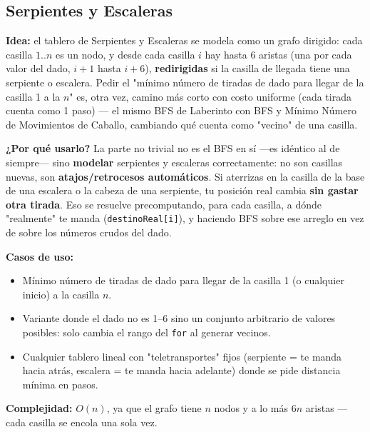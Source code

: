 \documentclass[10pt,a4paper,twocolumn]{article}
\begin{document}
\subsection{Serpientes y Escaleras}

\textbf{Idea:} el tablero de Serpientes y Escaleras se modela como un
grafo dirigido: cada casilla $1..n$ es un nodo, y desde cada casilla
$i$ hay hasta 6 aristas (una por cada valor del dado, $i+1$ hasta
$i+6$), \textbf{redirigidas} si la casilla de llegada tiene una
serpiente o escalera. Pedir el "mínimo número de tiradas de dado para
llegar de la casilla 1 a la $n$" es, otra vez, camino más corto con
costo uniforme (cada tirada cuenta como 1 paso) — el mismo BFS de
Laberinto con BFS y Mínimo Número de Movimientos de Caballo, cambiando
qué cuenta como "vecino" de una casilla.

\textbf{¿Por qué usarlo?} La parte no trivial no es el BFS en sí
—es idéntico al de siempre— sino \textbf{modelar} serpientes y
escaleras correctamente: no son casillas nuevas, son
\textbf{atajos/retrocesos automáticos}. Si aterrizas en la casilla
de la base de una escalera o la cabeza de una serpiente, tu posición
real cambia \textbf{sin gastar otra tirada}. Eso se resuelve
precomputando, para cada casilla, a dónde "realmente" te manda
(\texttt{destinoReal[i]}), y haciendo BFS sobre ese arreglo en vez de
sobre los números crudos del dado.

\textbf{Casos de uso:}

\begin{itemize}
	\item Mínimo número de tiradas de dado para llegar de la casilla
	1 (o cualquier inicio) a la casilla $n$.
	\item Variante donde el dado no es 1–6 sino un conjunto arbitrario
	de valores posibles: solo cambia el rango del \texttt{for} al
	generar vecinos.
	\item Cualquier tablero lineal con "teletransportes" fijos
	(serpiente = te manda hacia atrás, escalera = te manda hacia
	adelante) donde se pide distancia mínima en pasos.
\end{itemize}

\textbf{Complejidad:} $O(n)$, ya que el grafo tiene $n$ nodos y a lo
más $6n$ aristas — cada casilla se encola una sola vez.
\end{document}
